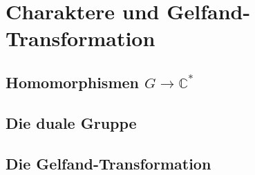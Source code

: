 %
%
%
\section{Charaktere und Gelfand-Transformation
\label{buch:gruppen:section:gelfand}}

%
%
\subsection{Homomorphismen $G\to \mathbb{C}^*$}

%
%
\subsection{Die duale Gruppe}

%
%
\subsection{Die Gelfand-Transformation}

